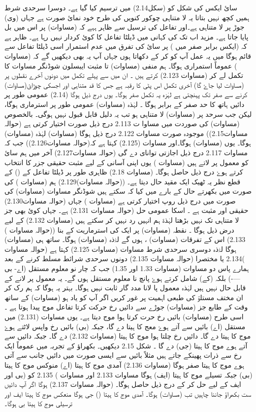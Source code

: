 سائ ایکس کی شکل کو (سکل2.14) میں ترسیم کیا گیا ہے۔ دوسرا سرحدی شرط ہمیں کچھ نہیں بتاتا یہ لا متناہی چوکور کنویں کی طرح خود نمائ صورت ہے جہاں (وی) جوڑ پر لا متناہی ہے۔اور تفاعل کی ترسیل سے ظاہر ہہے کہ (مساوات) پر اس میں بل پایا جاتا ہے۔ مزید اب تک کی کہانی میں ڈیلٹا تفاعل کا کوئ کردار نہیں رہا ہے۔ ظاہر ہے کہ (ایکس برابر صفر میں ) پر سائ کی تفرق میں عدم استمرار اسی ڈیلٹا تفاعل سے قائم ہوگا میں یہ عمل آپ کو کر کے دکھاتا ہوں جہاں آپ یہ بھی دیکھیں گے کہ (مساوات ) عموماً استمراری ہوگا۔ ہم منفی (مساوات) تا مثبت ایبسلون شوڈنگر مساوات کا تکمل لے کر (مساوات 2.123) کرتے ہیں ۔ ان میں سے پہلے تکمل میں دونوں آخرے نقطوں پر (مساوات لیا جاۓ گا) آخری تکمل اس پٹی کا رقبہ ہے جس کا قد متناہی اور اجسکی چوڑائ(مساوات) کرنے سے صفر تک پہنچتی ہے لہٰزہ یہ تکمل صفر ہوگا۔ یوں درج ذیل ہوگا (2.14) عمومی طور پر دائیں ہاتھ کا حد صفر کے برابر ہوگا ۔ لہٰذہ (مساوات) عمومی طور پر استرماری ہوگا، لیکن جب سرحد پر (مساوات) لا متناہی ہو تب یہ دلیل قابل قبول نہیں ہوگی۔ بالخصوص (مساوات) کی صوردت میں مساوا ت 2.113
 درج ذیل صورت اختیار کرتی ہے (حوالہ مساوات2.15)) موجودہ صورت مساوات 2.122 درج ذیل ہوگا (مساوات) لہٰذہ (مساوات) ہوگا۔ یوں (مساوات) ہوگا۔اور مساوات (2.125) کہتا ہے کہ(حوالہ مساوات2.126)) جب کہ مساوات 2.117 درج ذیل اجازتی توانای دے گی (حوالہ مساوات2.127) آخر میں ہم سائ کو معمول پر لاتے ہیں (مساوات ) یوں اپنی آسانی کے لیے مثبت حقیقی جزر کا انتخاب کرتے ہوۓ درج ذیل حاصل ہوگا۔ (مساوات 2.18) ظاہری طور پر ڈیلٹا تفاعل کے () کے قطع نظر یہ ٹھیک ایک مقید حال دیتا ہے۔ ((حوالہ مساوات)2.129)
ہم (مساوات ) کی صورت میں بکھرتے حال کے بارے میں کیا کہ سکتے ہیں شوڈنگر مساوات (مساوات) کی صورت میں درج ذیل روپ اختیار کرتی ہے (مساوات ) جہاں (حوالہ مساوات2.130) حقیقی اور مثبت ہے ۔ اسکا عمومی حل  
(حوالہ مساوات 2.131)  ہے۔  جہاں کوئ بھی جز لا متناہی تک نہیں بڑھتا لہٰذۃ ہم انہیں رد نہیں کر سکتے ہیں (مساوات 2.132) کے لیے درض ذیل ہوگا ۔ نقطہ (مساوات) پر ایک کی استرماریت کے بنا ((حوالہ مساوات ) 2.133) اس کے تفرقات (مساوات)  ، ہوں گے لۃٰذہ (مساوات) ہوگا۔ ساتھ ہی (مساوات) ہوگا لۃٰذہ دوسری سرحدی شرط مساوات (مساوات 2.125) کہتا ہے (حوالہ مساوات )2.134  یا مختصرا	 (حوالہ مساوات 2.135)  دونوں سرحدی شرائط مسلط کرنے کے بعد ہمارے پاس دو مساوات (مساوات 1.33 اور 1.35) جب کہ چار نو معلوم مستقل (اے- بی ----) بلکہ (کے) شامل کرتے ہوۓ پانچ نا معلوم مستقل ہوں گے۔ یہ معمول پر لانے کے قابل حال نہیں ہیں لہٰذہ معمول پا لانا مدد گار ثابت نہیں ہوگا۔ بہتر یہ ہوگا کہ ہم رک کر ان مختف مستلوؐ کی طبعی اہمیت پر غور کریں اگر آپ کو یاد ہو (مساوات) کے ساتھ وقت کے طابع جز (مساوات) جوڑے سے دائیں رخ حرکت کرتا تفاعل موج پیدا ہوتا ہے ۔ اسی طرح (مساوات) بائیں رخ حرت کرتا ہوا موج دیتا ہے۔ یوں مساوات (2.131) میں مستقل (اے) بائیں سے آتے ہوۓ معج کا ہیتا دے گا، جبکہ (بی) بائیں رخ واپس لاٹتے ہوۓ موج کا ہیتا دے گا۔ دائیں رخ چلتا ہوا موج کا ہیتا (مساوات 2.132) دے گا۔ جبکہ دائیں سے آتے ہوے موج کا ہیتا (جی) دے گا ۔ شکل 2.15 دیکھیں۔ بکھراؤ کے تجربہ میں عموماً ایک رخ سے ذرات پھینکے جاتے ہیں مثلاً بائیں سے ایسی صورت میں دائیں جانب سے آتی ہوے موج کا ہیتا صفر ہوگا (مساوات 2.136) آمدی موج کا ہیتا (اے) منوکس موج کا ہیتا (بی) جبکہ تسیلے موج کا ہیتا (ایف) ہوگا   مساوات 2.133 اور مساوات ) 2.135
 کو (بی اور ایف کے لیے حل کر کے درج ذیل حاصل ہوگا۔ (حوالہ مساوات 2.137) ہوگا اگر آپ دائیں ست بکھراؤ جاننا چاہیں تب (مساوات) ہوگا۔ آمدی موج کا ہیتا ()
جی ہوگا منعکس موج کا ہیتا ایف اور ترسیلی موج کا ہیتا بی ہوگا۔

